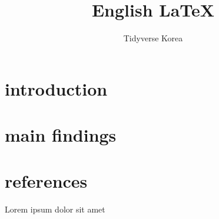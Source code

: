 \documentclass{article}
\begin{document}
	\title{English \LaTeX}
	\author{Tidyverse Korea}
	\maketitle
	
	\abstract{}
		\lipsum[1]	
	\section{introduction}
		\lipsum[3]
	\section{main findings}
		\lipsum[1-2]
	\section{references}
		Lorem \autocite{sigfridsson}
		ipsum \autocite{worman}
		dolor \autocite{nussbaum}
		sit \autocite{sigfridsson}
		amet \autocite{geer}	
	\printbibliography
\end{document}
